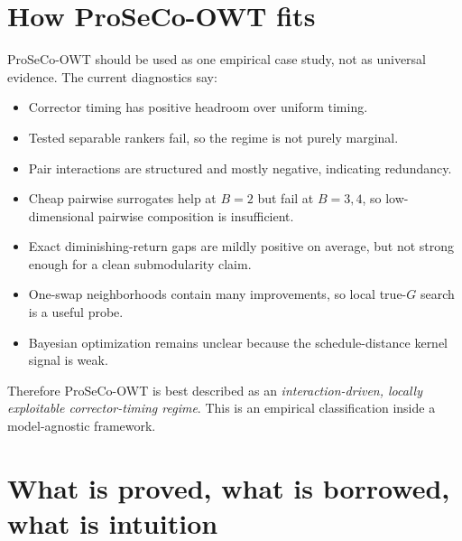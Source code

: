 \documentclass[11pt]{article}
\newcommand{\1}{\mathbf 1}
\begin{document}
\section{How ProSeCo-OWT fits}

ProSeCo-OWT should be used as one empirical case study, not as universal
evidence.  The current diagnostics say:

\begin{itemize}[leftmargin=1.5em]
\item Corrector timing has positive headroom over uniform timing.
\item Tested separable rankers fail, so the regime is not purely marginal.
\item Pair interactions are structured and mostly negative, indicating
redundancy.
\item Cheap pairwise surrogates help at \(B=2\) but fail at \(B=3,4\), so
low-dimensional pairwise composition is insufficient.
\item Exact diminishing-return gaps are mildly positive on average, but not
strong enough for a clean submodularity claim.
\item One-swap neighborhoods contain many improvements, so local true-\(G\)
search is a useful probe.
\item Bayesian optimization remains unclear because the schedule-distance
kernel signal is weak.
\end{itemize}

Therefore ProSeCo-OWT is best described as an
\emph{interaction-driven, locally exploitable corrector-timing regime}.  This
is an empirical classification inside a model-agnostic framework.

\section{What is proved, what is borrowed, what is intuition}
\end{document}
